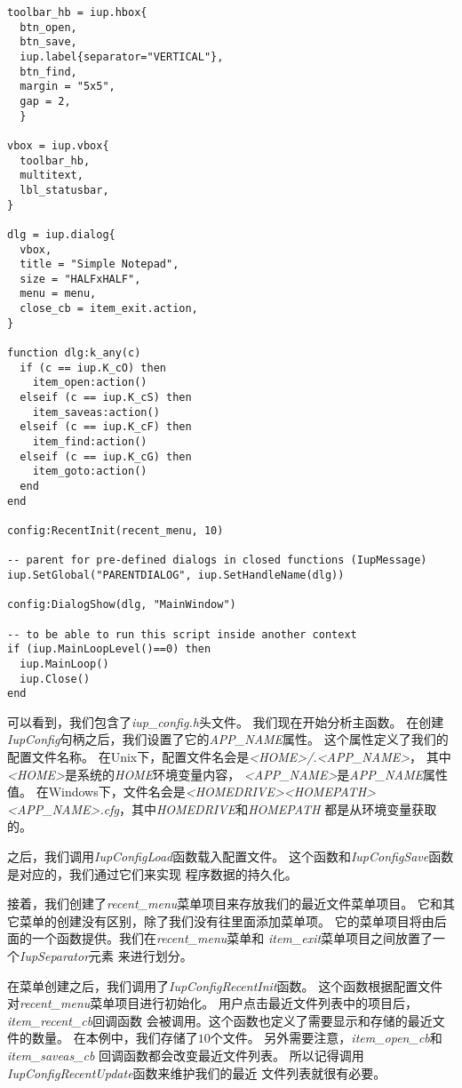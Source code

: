\documentclass{ctexart}
\begin{document}
\begin{lstlisting}
toolbar_hb = iup.hbox{
  btn_open,
  btn_save,
  iup.label{separator="VERTICAL"},
  btn_find,
  margin = "5x5",
  gap = 2,
  }

vbox = iup.vbox{
  toolbar_hb,
  multitext,
  lbl_statusbar,
}

dlg = iup.dialog{
  vbox,
  title = "Simple Notepad",
  size = "HALFxHALF",
  menu = menu,
  close_cb = item_exit.action,
}

function dlg:k_any(c)
  if (c == iup.K_cO) then
    item_open:action()
  elseif (c == iup.K_cS) then
    item_saveas:action()
  elseif (c == iup.K_cF) then
    item_find:action()
  elseif (c == iup.K_cG) then
    item_goto:action()
  end
end

config:RecentInit(recent_menu, 10)

-- parent for pre-defined dialogs in closed functions (IupMessage)
iup.SetGlobal("PARENTDIALOG", iup.SetHandleName(dlg))

config:DialogShow(dlg, "MainWindow")

-- to be able to run this script inside another context
if (iup.MainLoopLevel()==0) then
  iup.MainLoop()
  iup.Close()
end
\end{lstlisting}

可以看到，我们包含了\emph{iup\_config.h}头文件。
我们现在开始分析主函数。
在创建\emph{IupConfig}句柄之后，我们设置了它的\emph{APP\_NAME}属性。
这个属性定义了我们的配置文件名称。
在Unix下，配置文件名会是\emph{<HOME>/.<APP\_NAME>}，
其中\emph{<HOME>}是系统的\emph{HOME}环境变量内容，
\emph{<APP\_NAME>}是\emph{APP\_NAME}属性值。
在Windows下，文件名会是\emph{<HOMEDRIVE><HOMEPATH>
\\<APP\_NAME>.cfg}，其中\emph{HOMEDRIVE}和\emph{HOMEPATH}
都是从环境变量获取的。

之后，我们调用\emph{IupConfigLoad}函数载入配置文件。
这个函数和\emph{IupConfigSave}函数是对应的，我们通过它们来实现
程序数据的持久化。

接着，我们创建了\emph{recent\_menu}菜单项目来存放我们的最近文件菜单项目。
它和其它菜单的创建没有区别，除了我们没有往里面添加菜单项。
它的菜单项目将由后面的一个函数提供。我们在\emph{recent\_menu}菜单和
\emph{item\_exit}菜单项目之间放置了一个\emph{IupSeparator}元素
来进行划分。

在菜单创建之后，我们调用了\emph{IupConfigRecentInit}函数。
这个函数根据配置文件对\emph{recent\_menu}菜单项目进行初始化。
用户点击最近文件列表中的项目后，\emph{item\_recent\_cb}回调函数
会被调用。这个函数也定义了需要显示和存储的最近文件的数量。
在本例中，我们存储了$10$个文件。
另外需要注意，\emph{item\_open\_cb}和\emph{item\_saveas\_cb}
回调函数都会改变最近文件列表。
所以记得调用\emph{IupConfigRecentUpdate}函数来维护我们的最近
文件列表就很有必要。
\end{document}
